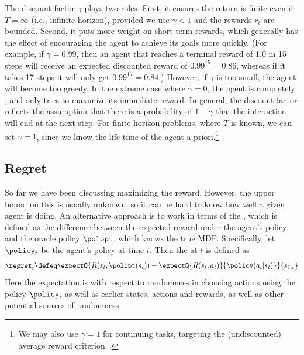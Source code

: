 The discount factor $\gamma$ plays two roles.
First, it ensures the return is finite
even if  $T=\infty$ (i.e., infinite horizon),
provided we use $\gamma<1$ and the rewards $r_t$ are bounded.
Second, it puts more weight on short-term rewards,
which generally has the effect of encouraging the agent
to achieve its goals more quickly.
(For example, if $\gamma=0.99$, then an agent that reaches a terminal reward
of 1.0 in 15 steps will receive
an expected discounted reward of
$0.99^{15}=0.86$, whereas if it takes 17 steps it will only
get $0.99^{17}=0.84$.)
However, if $\gamma$ is too small,
the agent will become too greedy.
In the extreme case where $\gamma=0$,
the agent is completely ,
and only tries to maximize its immediate reward.
In general,  the discount factor reflects
the assumption that  there is a probability of $1-\gamma$ that the
interaction will end at the next step.
For finite horizon problems, where $T$ is known,
we can set $\gamma=1$,
since we know the life time of the agent a priori.\footnote{
%
We may also use $\gamma=1$ for continuing tasks, targeting the (undiscounted) average
reward criterion~\citep{Puterman94}.} 

\subsection{Regret}
\label{sec:regret}

So far we have been discussing maximizing the reward.
However, the upper bound on this is usually unknown,
so it can be hard to know how well a given agent is doing.
An alternative approach is to work in terms
of the ,
which is defined as the difference
between the expected reward under the agent's policy
and the oracle policy $\polopt$, which knows
the true MDP.
Specifically, let $\policy_t$ be the agent's policy at time $t$.
Then  the
 at $t$ is defined as
\begin{align}
\regret_t
\defeq \expectQ{
  R(s_t,\polopt(s_t))
-
\expectQ{R(s_t,a_t)}{\policy(a_t|s_t)}
}{s_{1:t}}
\end{align}
Here  the expectation is with respect to randomness in
choosing actions using the policy $\policy$,
as well as  earlier states, actions and rewards,
as well as other potential sources of randomness.

